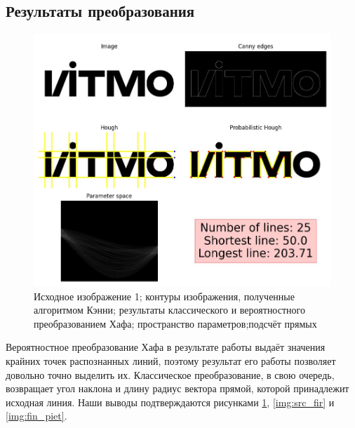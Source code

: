 \subsection{Результаты преобразования}

\begin{figure}[ht!]
    \centering
    \includegraphics[width=\textwidth]{images/lines/ITMO.jpg}
    \caption{Исходное изображение 1; контуры изображения, полученные алгоритмом Кэнни; результаты классического и вероятностного преобразованием Хафа; пространство параметров;подсчёт прямых}
    \label{img:fin_ITMO}
\end{figure} 

\clearpage

Вероятностное преобразование Хафа в результате работы выдаёт значения крайних точек распознанных линий, поэтому результат его работы позволяет довольно точно выделить их. Классическое преобразование, в свою очередь, возвращает угол наклона и длину радиус вектора прямой, которой принадлежит исходная линия. Наши выводы подтверждаются рисунками \ref*{img:fin_ITMO}, \ref*{img:src_fir} и \ref*{img:fin_piet}.

